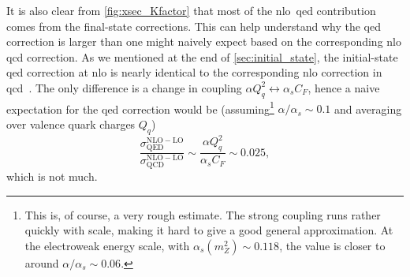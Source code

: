 It is also clear from \cref{fig:xsec_Kfactor} that most of the \gls{nlo}~\gls{qed} contribution comes from the final-state corrections.
This can help understand why the \gls{qed} correction is larger than one might naively expect based on the corresponding \gls{nlo} \gls{qcd} correction.
As we mentioned at the end of \cref{sec:initial_state}, the initial-state \gls{qed} correction at \gls{nlo} is nearly identical to the corresponding \gls{nlo} correction in \gls{qcd}~\cite{Tore:2022}. The only difference is a change in coupling $\alpha Q_q^2 \leftrightarrow \alpha_s C_F$, hence a naive expectation for the \gls{qed} correction would be (assuming\footnote{This is, of course, a very rough estimate. The strong coupling runs rather quickly with scale, making it hard to give a good general approximation. At the electroweak energy scale, with $\alpha_s(m_Z^2)\sim 0.118$, the value is closer to around $\alpha/\alpha_s \sim 0.06$.} $\alpha/\alpha_s \sim 0.1$ and averaging over valence quark charges $Q_q$)
\begin{equation}\label{eq:naive_is_correction}
    \frac{\sigma_{\mathrm{QED}}^{\mathrm{NLO}-\mathrm{LO}}}{\sigma_{\mathrm{QCD}}^{\mathrm{NLO}-\mathrm{LO}}} \sim \frac{\alpha Q_q^2}{\alpha_s C_F} \sim 0.025,
\end{equation}
which is not much.


